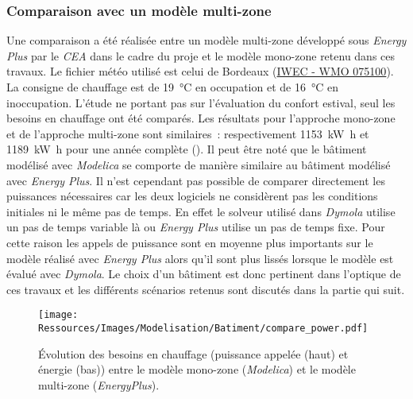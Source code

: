 \subsubsection{Comparaison avec un modèle multi-zone} %
\label{ssub:comparaison_avec_un_modele_multi_zone}
Une comparaison a été réalisée entre un modèle multi-zone développé sous \textit{Energy Plus}
par le \textit{CEA} dans le cadre du proje  et le modèle mono-zone
retenu dans ces travaux. Le fichier météo utilisé est celui de Bordeaux
(\href{https://www.energyplus.net/weather-download/europe_wmo_region_6/FRA//FRA_Bordeaux.075100_IWEC/all}{IWEC - WMO 075100}).
La consigne de chauffage est de \SI{19}{\celsius} en occupation et de \SI{16}{\celsius} en
inoccupation. L’étude ne portant pas sur l’évaluation du confort estival, seul les
besoins en chauffage ont été comparés. Les résultats pour l’approche mono-zone et de l’approche
multi-zone sont similaires~: respectivement \SI{1153}{\kilo\watt\hour} et
\SI{1189}{\kilo\watt\hour} pour une année complète ().
Il peut être noté que le bâtiment modélisé avec \textit{Modelica} se comporte de
manière similaire au bâtiment modélisé avec \textit{Energy Plus}. Il n’est cependant
pas possible de comparer directement les puissances nécessaires car les deux logiciels
ne considèrent pas les conditions initiales ni le même pas de temps. En effet le solveur
utilisé dans \textit{Dymola} utilise un pas de temps variable là ou \textit{Energy Plus}
utilise un pas de temps fixe. Pour cette raison les appels de puissance sont en moyenne
plus importants sur le modèle réalisé avec \textit{Energy Plus} alors qu’il sont plus
lissés lorsque le modèle est évalué avec \textit{Dymola}. Le choix d’un bâtiment est
donc pertinent dans l’optique de ces travaux et les différents scénarios retenus
sont discutés dans la partie qui suit.

\begin{figure}
    \centering
    \texttt{[image: Ressources/Images/Modelisation/Batiment/compare\_power.pdf]}
    \caption[Évolution des besoins de chauffage entre le modèle mono-zone et multi-zone]
             {Évolution des besoins en chauffage (puissance appelée (haut) et énergie (bas)) entre le modèle mono-zone
              (\textit{Modelica}) et le modèle multi-zone (\textit{EnergyPlus}).}
    \label{fig:compare_models}
\end{figure}


